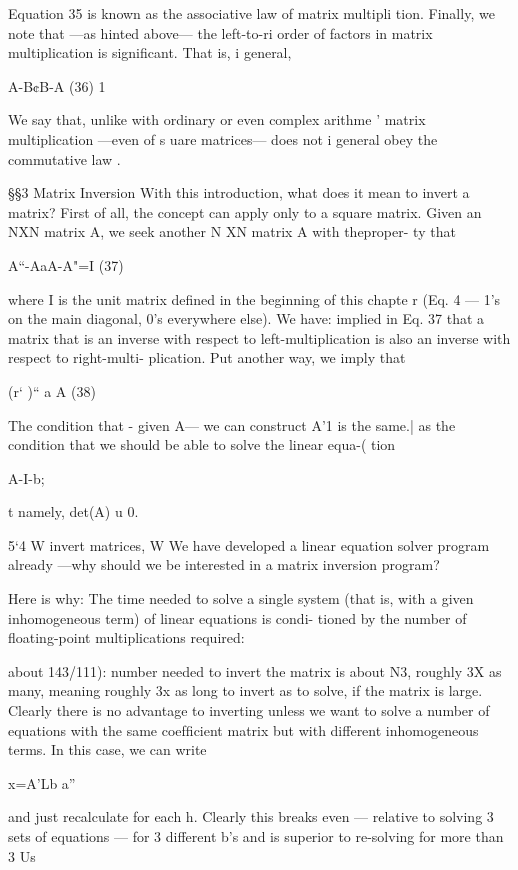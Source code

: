 {{{{{{{{{{{Equation 35 is known as the associative law of matrix multipli
tion. Finally, we note that —as hinted above— the left-to-ri
order of factors in matrix multiplication is signiﬁcant. That is, i
general,

A-B¢B-A (36) 1

We say that, unlike with ordinary or even complex arithme '
matrix multiplication —even of s uare matrices— does not i
general obey the commutative law .

§§3 Matrix Inversion
With this introduction, what does it mean to invert a matrix? First
of all, the concept can apply only to a square matrix. Given an
NXN matrix A, we seek another N XN matrix A with theproper-
ty that

 

A“-AaA-A"=I (37)

where I is the unit matrix deﬁned in the beginning of this chapte r
(Eq. 4 — 1’s on the main diagonal, 0’s everywhere else). We have:
implied in Eq. 37 that a matrix that is an inverse with respect to
left-multiplication is also an inverse with respect to right-multi-
plication. Put another way, we imply that

(r‘ )“ a A (38)

The condition that - given A— we can construct A'1 is the same.|
as the condition that we should be able to solve the linear equa-(
tion

A-I-b;

t namely, det(A) u 0.

5‘4 W invert matrices, W
We have developed a linear equation solver program already
—why should we be interested in a matrix inversion program?

Here is why: The time needed to solve a single system (that is,
with a given inhomogeneous term) of linear equations is condi-
tioned by the number of ﬂoating-point multiplications required:

about 143/111): number needed to invert the matrix is about N3,
roughly 3X as many, meaning roughly 3x as long to invert as to
solve, if the matrix is large. Clearly there is no advantage to
inverting unless we want to solve a number of equations with the
same coefﬁcient matrix but with different inhomogeneous terms.
In this case, we can write

x=A'Lb a”

and just recalculate for each h. Clearly this breaks even — relative
to solving 3 sets of equations — for 3 different b's and is superior
to re-solving for more than 3 Us

}}}}}}}}}}}
